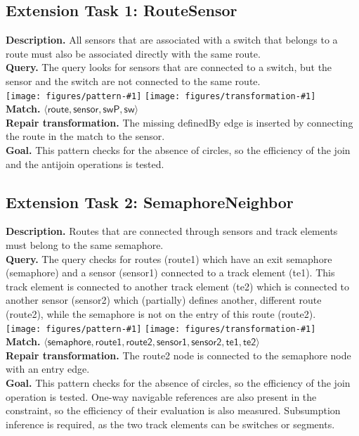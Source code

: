 \documentclass[submission,copyright,creativecommons]{eptcs}
\newcommand{\ttctransformation}[1]{
	\texttt{[image: figures/pattern-\#1]}
	\texttt{[image: figures/transformation-\#1]}
	\\
}
\begin{document}
\subsection{Extension Task 1: RouteSensor}
\label{routesensor}
\textbf{Description.} All sensors that are associated with a switch that belongs to a route must also be associated directly with the same route. \\
\textbf{Query.} The query looks for sensors that are connected to a switch, but the sensor and the switch are not connected to the same route. \\
\ttctransformation{routesensor}
\textbf{Match.} $\langle \mathsf{route}, \mathsf{sensor}, \mathsf{swP}, \mathsf{sw} \rangle$ \\
\textbf{Repair transformation.} The missing \textsf{definedBy} edge is inserted by connecting the \textsf{route} in the match to the \textsf{sensor}. \\
\textbf{Goal.} This pattern checks for the absence of circles, so the efficiency of the join and the antijoin operations is tested.


\subsection{Extension Task 2: SemaphoreNeighbor}
\label{semaphoreneighbor}
\textbf{Description.} Routes that are connected through sensors and track elements must belong to the same semaphore. \\
\textbf{Query.} The query checks for routes (\textsf{route1}) which have an exit semaphore (\textsf{semaphore}) and a sensor (\textsf{sensor1}) connected to a track element (\textsf{te1}). This track element is connected to another track element (\textsf{te2}) which is connected to another sensor (\textsf{sensor2}) which (partially) defines another, different route (\textsf{route2}), while the semaphore is not on the entry of this route (\textsf{route2}). \\
\ttctransformation{semaphoreneighbor}
\textbf{Match.} $\langle \mathsf{semaphore}, \mathsf{route1}, \mathsf{route2}, \mathsf{sensor1}, \mathsf{sensor2}, \mathsf{te1}, \mathsf{te2} \rangle$ \\
\textbf{Repair transformation.} The \textsf{route2} node is connected to the \textsf{semaphore} node with an \textsf{entry} edge. \\
\textbf{Goal.} This pattern checks for the absence of circles, so the efficiency of the join operation is tested. One-way navigable references are also present in the constraint, so the efficiency of their evaluation is also measured. Subsumption inference is required, as the two track elements can be switches or segments.
\end{document}
